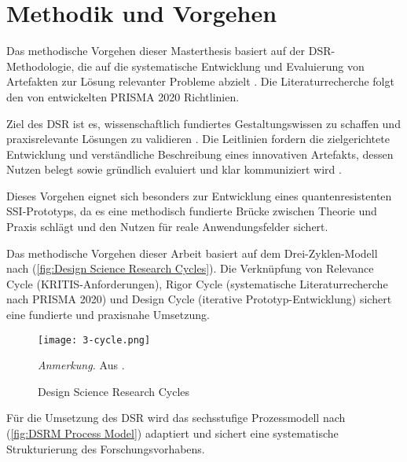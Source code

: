 \newpage
\section{Methodik und Vorgehen} \label{sec:Methodik und Vorgehen}

Das methodische Vorgehen dieser Masterthesis basiert auf der \ac{DSR}-Methodologie, die auf die systematische Entwicklung und Evaluierung von Artefakten zur Lösung relevanter Probleme abzielt \parencite[S. 78]{hevner_DesignScienceInformationsystemsresearch_2004}. Die Literaturrecherche folgt den von \textcite{page_PRISMA2020Statementupdatedguidelinereportingsystematicreviews_2021} entwickelten \ac{PRISMA} 2020 Richtlinien.

Ziel des \ac{DSR} ist es, wissenschaftlich fundiertes Gestaltungswissen zu schaffen und praxisrelevante Lösungen zu validieren \parencite[S. 83]{hevner_DesignScienceInformationsystemsresearch_2004}. Die Leitlinien fordern die zielgerichtete Entwicklung und verständliche Beschreibung eines innovativen Artefakts, dessen Nutzen belegt sowie gründlich evaluiert und klar kommuniziert wird \parencite[S. 82]{hevner_DesignScienceInformationsystemsresearch_2004}.

Dieses Vorgehen eignet sich besonders zur Entwicklung eines quantenresistenten \ac{SSI}-Prototyps, da es eine methodisch fundierte Brücke zwischen Theorie und Praxis schlägt und den Nutzen für reale Anwendungsfelder sichert.

Das methodische Vorgehen dieser Arbeit basiert auf dem Drei-Zyklen-Modell nach \textcite[S. 88]{hevner_ThreeCycleViewDesignScienceResearch_2007} (\autoref{fig:Design Science Research Cycles}). Die Verknüpfung von Relevance Cycle (KRITIS-Anforderungen), Rigor Cycle (systematische Literaturrecherche nach \ac{PRISMA} 2020) und Design Cycle (iterative Prototyp-Entwicklung) sichert eine fundierte und praxisnahe Umsetzung.

\begin{figure}[H]
    \centering
    \texttt{[image: 3-cycle.png]}
    \caption{Design Science Research Cycles}
    \begin{flushleft}
    \textit{Anmerkung.} Aus \textcite[S. 88]{hevner_ThreeCycleViewDesignScienceResearch_2007}.
    \end{flushleft}
    \label{fig:Design Science Research Cycles}
\end{figure}

Für die Umsetzung des \ac{DSR} wird das sechsstufige Prozessmodell nach \textcite[S. 54]{peffers_DesignScienceResearchmethodologyinformationsystemsresearch_2007} (\autoref{fig:DSRM Process Model}) adaptiert und sichert eine systematische Strukturierung des Forschungsvorhabens.

